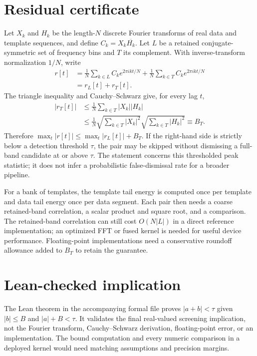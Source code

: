 \documentclass[11pt]{article}
\begin{document}
\section{Residual certificate}
Let $X_k$ and $H_k$ be the length-$N$ discrete Fourier transforms of real data and template sequences, and define $C_k=X_k\overline{H_k}$. Let $L$ be a retained conjugate-symmetric set of frequency bins and $T$ its complement. With inverse-transform normalization $1/N$, write
\begin{align}
 r[t] &= \frac{1}{N}\sum_{k\in L}C_k e^{2\pi i kt/N} + \frac{1}{N}\sum_{k\in T}C_k e^{2\pi i kt/N} \\
      &= r_L[t]+r_T[t].
\end{align}
The triangle inequality and Cauchy--Schwarz give, for every lag $t$,
\begin{align}
 |r_T[t]| &\leq \frac{1}{N}\sum_{k\in T}|X_k||H_k| \\
           &\leq \frac{1}{N}\sqrt{\sum_{k\in T}|X_k|^2}\sqrt{\sum_{k\in T}|H_k|^2} \equiv B_T.
\end{align}
Therefore $\max_t|r[t]|\leq\max_t|r_L[t]|+B_T$. If the right-hand side is strictly below a detection threshold $\tau$, the pair may be skipped without dismissing a full-band candidate at or above $\tau$. The statement concerns this thresholded peak statistic; it does not infer a probabilistic false-dismissal rate for a broader pipeline.

For a bank of templates, the template tail energy is computed once per template and data tail energy once per data segment. Each pair then needs a coarse retained-band correlation, a scalar product and square root, and a comparison. The retained-band correlation can still cost $O(N|L|)$ in a direct reference implementation; an optimized FFT or fused kernel is needed for useful device performance. Floating-point implementations need a conservative roundoff allowance added to $B_T$ to retain the guarantee.

\section{Lean-checked implication}
The Lean theorem in the accompanying formal file proves $|a+b|<\tau$ given $|b|\leq B$ and $|a|+B<\tau$. It validates the final real-valued screening implication, not the Fourier transform, Cauchy--Schwarz derivation, floating-point error, or an implementation. The bound computation and every numeric comparison in a deployed kernel would need matching assumptions and precision margins.
\end{document}
